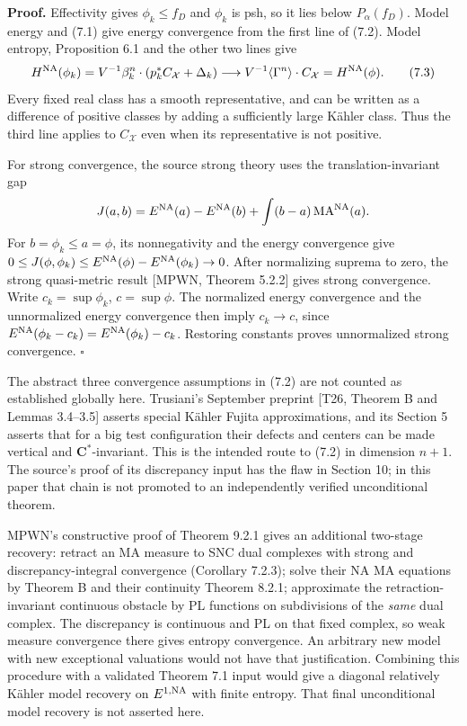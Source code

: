 \documentclass[
  11pt,
]{article}
\begin{document}
\textbf{Proof.} Effectivity gives \(\phi_k\leq f_D\) and \(\phi_k\) is
psh, so it lies below \(P_\alpha(f_D)\). Model energy and (7.1) give
energy convergence from the first line of (7.2). Model entropy,
Proposition 6.1 and the other two lines give \[
 H^{\rm NA}(\phi_k)=V^{-1}\beta_k^n\cdot(p_k^*C_{\mathcal X}+\Delta_k)
     \longrightarrow V^{-1}\langle\Gamma^n\rangle\cdot C_{\mathcal X}
     =H^{\rm NA}(\phi).                                     \tag{7.3}
\] Every fixed real class has a smooth representative, and can be
written as a difference of positive classes by adding a sufficiently
large Kähler class. Thus the third line applies to \(C_{\mathcal X}\)
even when its representative is not positive.

For strong convergence, the source strong theory uses the
translation-invariant gap \[
 J(a,b)=E^{\rm NA}(a)-E^{\rm NA}(b)+\int(b-a)\operatorname{MA}^{\rm NA}(a).
\] For \(b=\phi_k\leq a=\phi\), its nonnegativity and the energy
convergence give
\(0\leq J(\phi,\phi_k)\leq E^{\rm NA}(\phi)-E^{\rm NA}(\phi_k)\to0\).
After normalizing suprema to zero, the strong quasi-metric result
{[}MPWN, Theorem 5.2.2{]} gives strong convergence. Write
\(c_k=\sup\phi_k\), \(c=\sup\phi\). The normalized energy convergence
and the unnormalized energy convergence then imply \(c_k\to c\), since
\(E^{\rm NA}(\phi_k-c_k)=E^{\rm NA}(\phi_k)-c_k\). Restoring constants
proves unnormalized strong convergence. \(\square\)

The abstract three convergence assumptions in (7.2) are not counted as
established globally here. Trusiani's September preprint {[}T26, Theorem
B and Lemmas 3.4--3.5{]} asserts special Kähler Fujita approximations,
and its Section 5 asserts that for a big test configuration their
defects and centers can be made vertical and \(\mathbf C^*\)-invariant.
This is the intended route to (7.2) in dimension \(n+1\). The source's
proof of its discrepancy input has the flaw in Section 10; in this paper
that chain is not promoted to an independently verified unconditional
theorem.

MPWN's constructive proof of Theorem 9.2.1 gives an additional two-stage
recovery: retract an MA measure to SNC dual complexes with strong and
discrepancy-integral convergence (Corollary 7.2.3); solve their NA MA
equations by Theorem B and their continuity Theorem 8.2.1; approximate
the retraction-invariant continuous obstacle by PL functions on
subdivisions of the \emph{same} dual complex. The discrepancy is
continuous and PL on that fixed complex, so weak measure convergence
there gives entropy convergence. An arbitrary new model with new
exceptional valuations would not have that justification. Combining this
procedure with a validated Theorem 7.1 input would give a diagonal
relatively Kähler model recovery on \(E^{1,\rm NA}\) with finite
entropy. That final unconditional model recovery is not asserted here.
\end{document}
